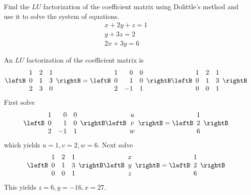 \begin{enumialphparenastyle}
\begin{ex} Find the $LU$ factorization of the coefficient matrix using Dolittle's
method and use it to solve the system of equations. 
\begin{equation*}
\begin{array}{c}
x+2y+z=1 \\ 
y+3z=2 \\ 
2x+3y=6
\end{array}
\end{equation*}
\begin{sol}
An $LU$ factorization of the coefficient matrix is
\[
\leftB
\begin{array}{rrr}
1 & 2 & 1 \\
0 & 1 & 3 \\
2 & 3 & 0
\end{array}
\rightB = \leftB
\begin{array}{rrr}
1 & 0 & 0 \\
0 & 1 & 0 \\
2 & -1 & 1
\end{array}
\rightB \leftB
\begin{array}{rrr}
1 & 2 & 1 \\
0 & 1 & 3 \\
0 & 0 & 1
\end{array}
\rightB
\]
First solve
\[
 \leftB
\begin{array}{rrr}
1 & 0 & 0 \\
0 & 1 & 0 \\
2 & -1 & 1
\end{array}
\rightB \leftB
\begin{array}{c}
u \\
v \\
w
\end{array}
\rightB =\leftB
\begin{array}{c}
1 \\
2 \\
6
\end{array}
\rightB
\]
which yields $u=1,v=2,w=6$. Next solve
\[
\leftB
\begin{array}{rrr}
1 & 2 & 1 \\
0 & 1 & 3 \\
0 & 0 & 1
\end{array}
\rightB \leftB
\begin{array}{c}
x \\
y \\
z
\end{array}
\rightB =\leftB
\begin{array}{c}
1 \\
2 \\
6
\end{array}
\rightB
\]
This yields $z=6,y=-16,x=27.$
\end{sol}
\end{ex}


\end{enumialphparenastyle}
